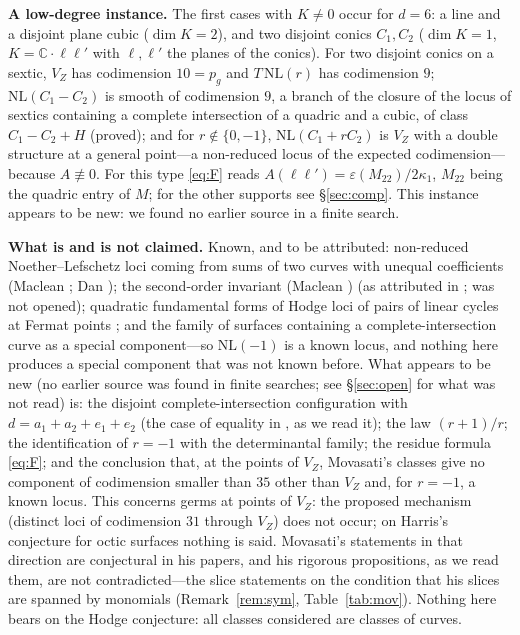 \documentclass[11pt]{article}
\numberwithin{equation}{section}
\theoremstyle{remark}
\newcommand{\CC}{\mathbb{C}}
\newcommand{\NL}{\mathrm{NL}}
\newcommand{\VZ}{V_Z}
\newcommand{\run}[1]{\medskip\noindent\textbf{#1}}
\begin{document}
\run{A low-degree instance.}
The first cases with $K\ne0$ occur for $d=6$: a line and a disjoint plane cubic ($\dim K=2$), and two disjoint
conics $C_1,C_2$ ($\dim K=1$, $K=\CC\cdot\ell\ell'$ with $\ell,\ell'$ the planes of the conics). For two disjoint
conics on a sextic, $\VZ$ has codimension $10=p_g$ and $T\,\NL(r)$ has codimension $9$; $\NL(C_1-C_2)$ is smooth
of codimension $9$, a branch of the closure of the locus of sextics containing a complete intersection of a
quadric and a cubic, of class $C_1-C_2+H$ (proved); and for $r\notin\{0,-1\}$, $\NL(C_1+rC_2)$ is $\VZ$ with a
double structure at a general point---a non-reduced locus of the expected codimension---because
$A\not\equiv0$. For this type \eqref{eq:F} reads $A(\ell\ell')=\varepsilon(M_{22})/2\kappa_1$, $M_{22}$ being the quadric entry of $M$; for the other supports see \S\ref{sec:comp}. This
instance appears to be new: we found no earlier source in a finite search.

\run{What is and is not claimed.}
Known, and to be attributed: non-reduced Noether--Lefschetz loci coming from sums of two curves with unequal
coefficients (Maclean \cite{Mac}; Dan \cite{Dan1,Dan2}); the second-order invariant (Maclean \cite{Mac}) (as attributed
in \cite{Mo21}; \cite{Mac} was not opened);
quadratic fundamental forms of Hodge loci of pairs of linear cycles at Fermat points \cite{DFV}; and the family
of surfaces containing a complete-intersection curve as a special component---so $\NL(-1)$ is a known locus, and
nothing here produces a special component that was not known before. What appears to be new (no earlier source was found in finite searches; see \S\ref{sec:open} for what was not read) is: the disjoint complete-intersection configuration with
$d=a_1+a_2+e_1+e_2$ (the case of equality in \cite[Thm~1.5]{Kl}, as we read it); the law $(r+1)/r$; the
identification of $r=-1$ with the determinantal family; the residue formula \eqref{eq:F}; and the conclusion
that, at the points of $\VZ$, Movasati's classes give no component of codimension smaller than $35$ other than
$\VZ$ and, for $r=-1$, a known locus. This concerns germs at points of $\VZ$: the proposed
mechanism (distinct loci of codimension $31$ through $\VZ$) does not occur; on Harris's conjecture for octic
surfaces nothing is said. Movasati's statements in that direction are conjectural in his papers, and his rigorous propositions, as
we read them, are not contradicted---the slice statements on the condition that his slices are spanned by
monomials (Remark~\ref{rem:sym}, Table~\ref{tab:mov}). Nothing here bears on the Hodge conjecture: all classes
considered are classes of curves.
\end{document}
